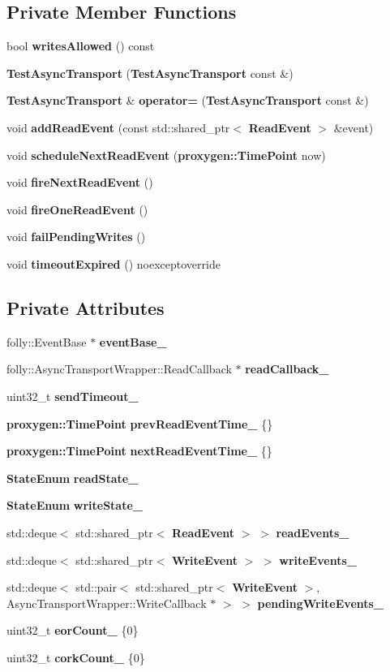 \subsection*{Private Member Functions}
\begin{DoxyCompactItemize}
\item 
bool {\bf writes\+Allowed} () const 
\item 
{\bf Test\+Async\+Transport} ({\bf Test\+Async\+Transport} const \&)
\item 
{\bf Test\+Async\+Transport} \& {\bf operator=} ({\bf Test\+Async\+Transport} const \&)
\item 
void {\bf add\+Read\+Event} (const std\+::shared\+\_\+ptr$<$ {\bf Read\+Event} $>$ \&event)
\item 
void {\bf schedule\+Next\+Read\+Event} ({\bf proxygen\+::\+Time\+Point} now)
\item 
void {\bf fire\+Next\+Read\+Event} ()
\item 
void {\bf fire\+One\+Read\+Event} ()
\item 
void {\bf fail\+Pending\+Writes} ()
\item 
void {\bf timeout\+Expired} () noexceptoverride
\end{DoxyCompactItemize}
\subsection*{Private Attributes}
\begin{DoxyCompactItemize}
\item 
folly\+::\+Event\+Base $\ast$ {\bf event\+Base\+\_\+}
\item 
folly\+::\+Async\+Transport\+Wrapper\+::\+Read\+Callback $\ast$ {\bf read\+Callback\+\_\+}
\item 
uint32\+\_\+t {\bf send\+Timeout\+\_\+}
\item 
{\bf proxygen\+::\+Time\+Point} {\bf prev\+Read\+Event\+Time\+\_\+} \{\}
\item 
{\bf proxygen\+::\+Time\+Point} {\bf next\+Read\+Event\+Time\+\_\+} \{\}
\item 
{\bf State\+Enum} {\bf read\+State\+\_\+}
\item 
{\bf State\+Enum} {\bf write\+State\+\_\+}
\item 
std\+::deque$<$ std\+::shared\+\_\+ptr$<$ {\bf Read\+Event} $>$ $>$ {\bf read\+Events\+\_\+}
\item 
std\+::deque$<$ std\+::shared\+\_\+ptr$<$ {\bf Write\+Event} $>$ $>$ {\bf write\+Events\+\_\+}
\item 
std\+::deque$<$ std\+::pair$<$ std\+::shared\+\_\+ptr$<$ {\bf Write\+Event} $>$, Async\+Transport\+Wrapper\+::\+Write\+Callback $\ast$ $>$ $>$ {\bf pending\+Write\+Events\+\_\+}
\item 
uint32\+\_\+t {\bf eor\+Count\+\_\+} \{0\}
\item 
uint32\+\_\+t {\bf cork\+Count\+\_\+} \{0\}
\end{DoxyCompactItemize}


